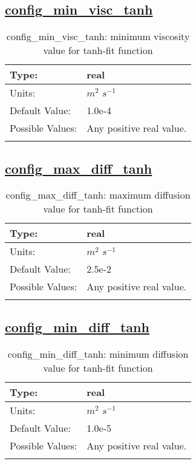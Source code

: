 \subsection[config\_min\_visc\_tanh]{\hyperref[sec:nm_tab_vmix_tanh]{config\_min\_visc\_tanh}}
\label{subsec:nm_sec_config_min_visc_tanh}
\begin{center}
\begin{longtable}{| p{2.0in} || p{4.0in} |}
    \hline
    Type: & real \\
    \hline
    Units: & $m^2$ $s^{-1}$ \\
    \hline
    Default Value: & 1.0e-4 \\
    \hline
    Possible Values: & Any positive real value. \\
    \hline
    \caption{config\_min\_visc\_tanh: minimum viscosity value for tanh-fit function}
\end{longtable}
\end{center}
\subsection[config\_max\_diff\_tanh]{\hyperref[sec:nm_tab_vmix_tanh]{config\_max\_diff\_tanh}}
\label{subsec:nm_sec_config_max_diff_tanh}
\begin{center}
\begin{longtable}{| p{2.0in} || p{4.0in} |}
    \hline
    Type: & real \\
    \hline
    Units: & $m^2$ $s^{-1}$ \\
    \hline
    Default Value: & 2.5e-2 \\
    \hline
    Possible Values: & Any positive real value. \\
    \hline
    \caption{config\_max\_diff\_tanh: maximum diffusion value for tanh-fit function}
\end{longtable}
\end{center}
\subsection[config\_min\_diff\_tanh]{\hyperref[sec:nm_tab_vmix_tanh]{config\_min\_diff\_tanh}}
\label{subsec:nm_sec_config_min_diff_tanh}
\begin{center}
\begin{longtable}{| p{2.0in} || p{4.0in} |}
    \hline
    Type: & real \\
    \hline
    Units: & $m^2$ $s^{-1}$ \\
    \hline
    Default Value: & 1.0e-5 \\
    \hline
    Possible Values: & Any positive real value. \\
    \hline
    \caption{config\_min\_diff\_tanh: minimum diffusion value for tanh-fit function}
\end{longtable}
\end{center}
